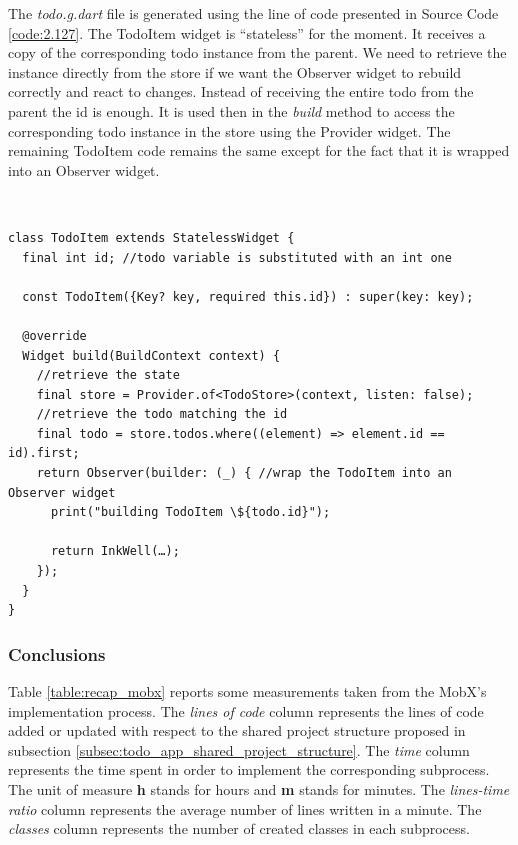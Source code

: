 The \textit{todo.g.dart} file is generated using the line of code presented in Source Code \ref{code:2.127}. The TodoItem widget is “stateless” for the moment. It receives a copy of the corresponding todo instance from the parent. We need to retrieve the instance directly from the store if we want the Observer widget to rebuild correctly and react to changes. Instead of receiving the entire todo from the parent the id is enough. It is used then in the \textit{build} method to access the corresponding todo instance in the store using the Provider widget. The remaining TodoItem code remains the same except for the fact that it is wrapped into an Observer widget.
\begin{code}
\mbox{}\\
 \mbox{}
		\label{code:2.14}
\begin{verbatim}
class TodoItem extends StatelessWidget {
  final int id; //todo variable is substituted with an int one

  const TodoItem({Key? key, required this.id}) : super(key: key);

  @override
  Widget build(BuildContext context) {
    //retrieve the state
    final store = Provider.of<TodoStore>(context, listen: false);
    //retrieve the todo matching the id
    final todo = store.todos.where((element) => element.id == id).first;
    return Observer(builder: (_) { //wrap the TodoItem into an Observer widget
      print("building TodoItem \${todo.id}");

      return InkWell(…);
    });
  }
}
\end{verbatim}
\mbox{}
\end{code}

\subsubsection{Conclusions} \label{par:todo_app_inherited_widget_introduction}
Table \ref{table:recap_mobx} reports some measurements taken from the MobX's implementation process. The \textit{lines of code} column represents the lines of code added or updated with respect to the shared project structure proposed in subsection \ref{subsec:todo_app_shared_project_structure}. The \textit{time }column represents the time spent in order to implement the corresponding subprocess. The unit of measure \textbf{h} stands for hours and \textbf{m} stands for minutes. The \textit{lines-time ratio} column represents the average number of lines written in a minute. The \textit{classes} column represents the number of created classes in each subprocess.

